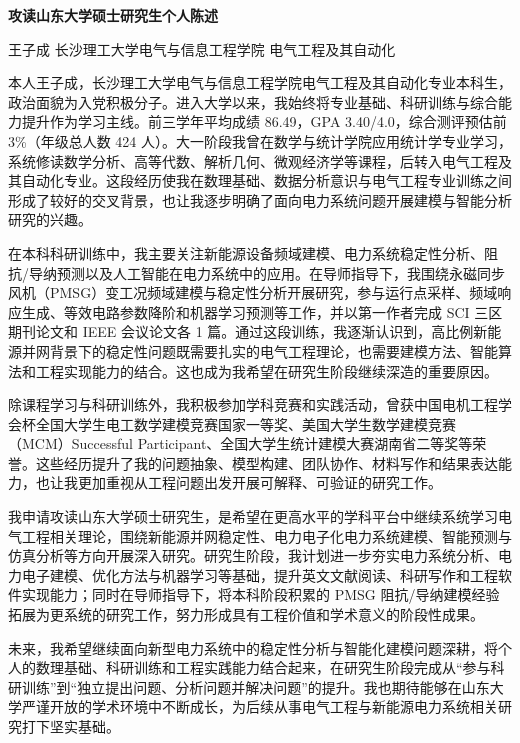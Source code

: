 \documentclass[UTF8,a4paper,11pt]{ctexart}
\begin{document}
\begin{center}
  {\sffamily\bfseries\fontsize{18pt}{23pt}\selectfont 攻读山东大学硕士研究生个人陈述}\par
  \vspace{0.35em}
  {\sffamily\color{textgray}王子成 \quad 长沙理工大学电气与信息工程学院 \quad 电气工程及其自动化}
\end{center}
\vspace{0.4em}

本人王子成，长沙理工大学电气与信息工程学院电气工程及其自动化专业本科生，政治面貌为入党积极分子。进入大学以来，我始终将专业基础、科研训练与综合能力提升作为学习主线。前三学年平均成绩 86.49，GPA 3.40/4.0，综合测评预估前 3\%（年级总人数 424 人）。大一阶段我曾在数学与统计学院应用统计学专业学习，系统修读数学分析、高等代数、解析几何、微观经济学等课程，后转入电气工程及其自动化专业。这段经历使我在数理基础、数据分析意识与电气工程专业训练之间形成了较好的交叉背景，也让我逐步明确了面向电力系统问题开展建模与智能分析研究的兴趣。

在本科科研训练中，我主要关注新能源设备频域建模、电力系统稳定性分析、阻抗/导纳预测以及人工智能在电力系统中的应用。在导师指导下，我围绕永磁同步风机（PMSG）变工况频域建模与稳定性分析开展研究，参与运行点采样、频域响应生成、等效电路参数降阶和机器学习预测等工作，并以第一作者完成 SCI 三区期刊论文和 IEEE 会议论文各 1 篇。通过这段训练，我逐渐认识到，高比例新能源并网背景下的稳定性问题既需要扎实的电气工程理论，也需要建模方法、智能算法和工程实现能力的结合。这也成为我希望在研究生阶段继续深造的重要原因。

除课程学习与科研训练外，我积极参加学科竞赛和实践活动，曾获中国电机工程学会杯全国大学生电工数学建模竞赛国家一等奖、美国大学生数学建模竞赛（MCM）Successful Participant、全国大学生统计建模大赛湖南省二等奖等荣誉。这些经历提升了我的问题抽象、模型构建、团队协作、材料写作和结果表达能力，也让我更加重视从工程问题出发开展可解释、可验证的研究工作。

我申请攻读山东大学硕士研究生，是希望在更高水平的学科平台中继续系统学习电气工程相关理论，围绕新能源并网稳定性、电力电子化电力系统建模、智能预测与仿真分析等方向开展深入研究。研究生阶段，我计划进一步夯实电力系统分析、电力电子建模、优化方法与机器学习等基础，提升英文文献阅读、科研写作和工程软件实现能力；同时在导师指导下，将本科阶段积累的 PMSG 阻抗/导纳建模经验拓展为更系统的研究工作，努力形成具有工程价值和学术意义的阶段性成果。

未来，我希望继续面向新型电力系统中的稳定性分析与智能化建模问题深耕，将个人的数理基础、科研训练和工程实践能力结合起来，在研究生阶段完成从“参与科研训练”到“独立提出问题、分析问题并解决问题”的提升。我也期待能够在山东大学严谨开放的学术环境中不断成长，为后续从事电气工程与新能源电力系统相关研究打下坚实基础。
\end{document}
